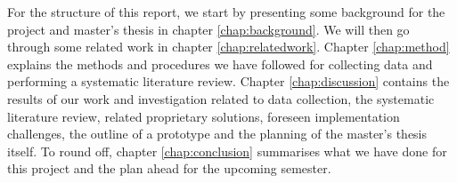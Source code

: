 For the structure of this report, we start by presenting some background for the project and master's thesis in chapter \ref{chap:background}. We will then go through some related work in chapter \ref{chap:relatedwork}. Chapter \ref{chap:method} explains the methods and procedures we have followed for collecting data and performing a systematic  literature review. Chapter \ref{chap:discussion} contains the results of our work and investigation related to data collection, the systematic literature review, related proprietary solutions, foreseen implementation challenges, the outline of a prototype and the planning of the master's thesis itself. To round off, chapter \ref{chap:conclusion} summarises what we have done for this project and the plan ahead for the upcoming semester.







\begin{comment}
The introduction of the thesis should take the reader all the way from the big picture and context of the project to the concrete task that has been solved in the thesis. A nice skeleton for a good introduction was given by \textcite{claerbout1991scrutiny}: \emph{review–claim–agenda}. In the review part, the background of the project is covered. This leads up to your claim, which is typically that some entity (software, device) or knowledge (research questions) is missing and sorely needed. The agenda part briefly summarises how your thesis contributes.
\end{comment}

